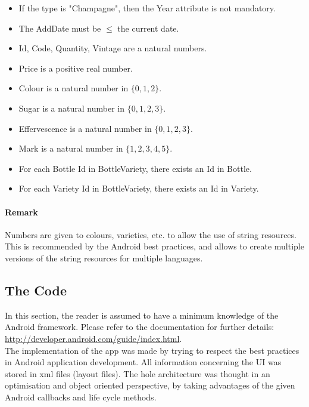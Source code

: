 \begin{itemize}
	\item If the type is "Champagne", then the Year attribute is not mandatory.
	\item The AddDate must be $\leq$ the current date.
	\item Id, Code, Quantity, Vintage are a natural numbers.
	\item Price is a positive real number.
	\item Colour is a natural number in $\{ 0, 1, 2\}$.
	\item Sugar is a natural number in $\{0, 1, 2, 3\}$.
	\item Effervescence is a natural number in $\{0, 1, 2, 3\}$.
	\item Mark is a natural number in $\{1, 2, 3, 4, 5\}$.
	\item For each Bottle Id in BottleVariety, there exists an Id in Bottle.
	\item For each Variety Id in BottleVariety, there exists an Id in Variety.
\end{itemize}

\paragraph{Remark}
Numbers are given to colours, varieties, etc. to allow the use of string resources. This is recommended by the Android best practices, and allows to create multiple versions of the string resources for multiple languages.

\subsection{The Code}

In this section, the reader is assumed to have a minimum knowledge of the Android framework. Please refer to the documentation for further details: \url{http://developer.android.com/guide/index.html}.\\

The implementation of the app was made by trying to respect the best practices in Android application development. All information concerning the UI was stored in xml files (layout files). The hole architecture was thought in an optimisation and object oriented perspective, by taking advantages of the given Android callbacks and life cycle methods.\\

